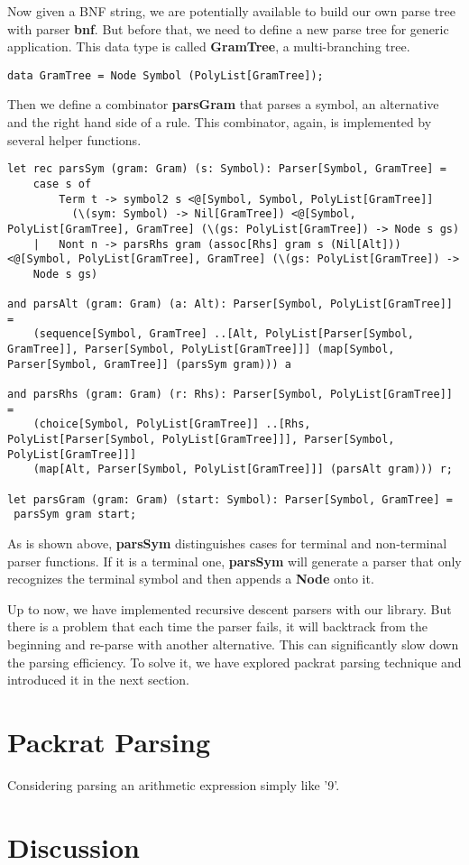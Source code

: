 Now given a BNF string, we are potentially available to build our own parse tree with parser \textbf{bnf}. But before that, we need to define a new parse tree for generic application. This data type is called \textbf{GramTree}, a multi-branching tree.
\begin{lstlisting}
data GramTree = Node Symbol (PolyList[GramTree]);
\end{lstlisting}
Then we define a combinator \textbf{parsGram} that parses a symbol, an alternative and the right hand side of a rule. This combinator, again, is implemented by several helper functions.
\begin{lstlisting}
let rec parsSym (gram: Gram) (s: Symbol): Parser[Symbol, GramTree] =
    case s of
        Term t -> symbol2 s <@[Symbol, Symbol, PolyList[GramTree]] 
          (\(sym: Symbol) -> Nil[GramTree]) <@[Symbol, PolyList[GramTree], GramTree] (\(gs: PolyList[GramTree]) -> Node s gs)
    |   Nont n -> parsRhs gram (assoc[Rhs] gram s (Nil[Alt])) <@[Symbol, PolyList[GramTree], GramTree] (\(gs: PolyList[GramTree]) -> 
    Node s gs)
    
and parsAlt (gram: Gram) (a: Alt): Parser[Symbol, PolyList[GramTree]] =
    (sequence[Symbol, GramTree] ..[Alt, PolyList[Parser[Symbol, GramTree]], Parser[Symbol, PolyList[GramTree]]] (map[Symbol, Parser[Symbol, GramTree]] (parsSym gram))) a
    
and parsRhs (gram: Gram) (r: Rhs): Parser[Symbol, PolyList[GramTree]] =
    (choice[Symbol, PolyList[GramTree]] ..[Rhs, PolyList[Parser[Symbol, PolyList[GramTree]]], Parser[Symbol, PolyList[GramTree]]] 
    (map[Alt, Parser[Symbol, PolyList[GramTree]]] (parsAlt gram))) r;
    
let parsGram (gram: Gram) (start: Symbol): Parser[Symbol, GramTree] =
 parsSym gram start;
\end{lstlisting}
As is shown above, \textbf{parsSym} distinguishes cases for terminal and non-terminal parser functions. If it is a terminal one, \textbf{parsSym} will generate a parser that only recognizes the terminal symbol and then appends a \textbf{Node} onto it.

Up to now, we have implemented recursive descent parsers with our library. But there is a problem that each time the parser fails, it will backtrack from the beginning and re-parse with another alternative. This can significantly slow down the parsing efficiency. To solve it, we have explored packrat parsing technique and introduced it in the next section.

\section{Packrat Parsing}
Considering parsing an arithmetic expression simply like '9'.

\section{Discussion}
